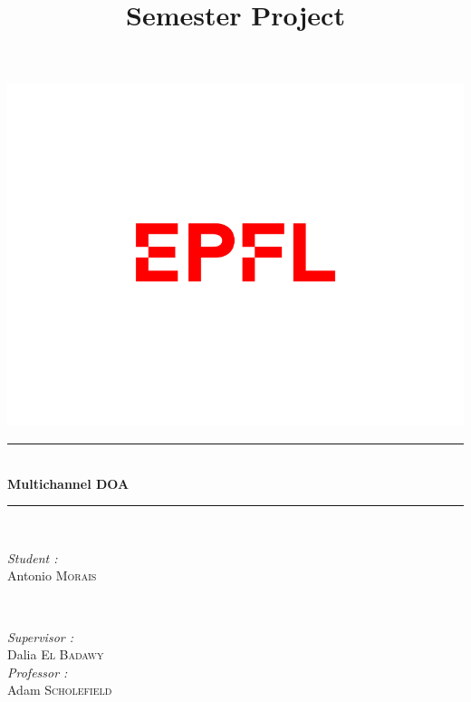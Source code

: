 \documentclass[10pt]{article}
\begin{document}
\title{Semester Project}

\begin{titlepage}

\newcommand{\HRule}{\rule{\linewidth}{0.5mm}} %

\center %


\centering
\includegraphics[scale=0.2]{EPFL-Logo.png}\\[1.5cm] %



\HRule \\[0.4cm]
    { \huge \bfseries Multichannel DOA\\[0.4cm] } %
\HRule \\[1.cm]

\begin{minipage}{0.4\textwidth}
\begin{flushleft} \large
\emph{Student :}\\

Antonio \textsc{Morais}\\

\end{flushleft}
\end{minipage}
~
\begin{minipage}{0.4\textwidth}
\begin{flushright} \large
\emph{Supervisor :}\\
Dalia \textsc{El Badawy}\\
\emph{Professor :}\\
Adam \textsc{Scholefield}\\


\end{flushright}
\end{minipage}
\end{titlepage}
\end{document}
